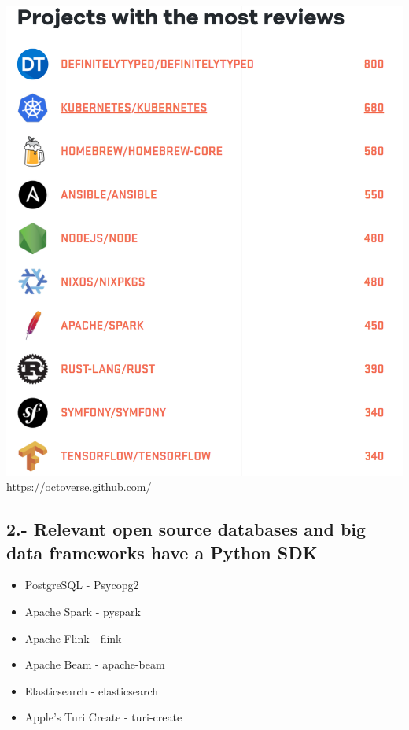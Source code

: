 \documentclass[11pt]{article}
\makeatletter
\def\maxwidth{\ifdim\Gin@nat@width>\linewidth\linewidth
    \else\Gin@nat@width\fi}
\let\Oldincludegraphics\includegraphics
\renewcommand{\includegraphics}[1]{\Oldincludegraphics[width=.8\maxwidth]{#1}}
\providecommand{\tightlist}{%
      \setlength{\itemsep}{0pt}\setlength{\parskip}{0pt}}
\makeatother
\begin{document}
\includegraphics{./img/top_2.png} https://octoverse.github.com/

    \hypertarget{relevant-open-source-databases-and-big-data-frameworks-have-a-python-sdk}{%
\subsection{2.- Relevant open source databases and big data frameworks
have a Python
SDK}\label{relevant-open-source-databases-and-big-data-frameworks-have-a-python-sdk}}

    \begin{itemize}
\tightlist
\item
  PostgreSQL - Psycopg2
\item
  Apache Spark - pyspark
\item
  Apache Flink - flink
\item
  Apache Beam - apache-beam
\item
  Elasticsearch - elasticsearch
\item
  Apple's Turi Create - turi-create
\end{itemize}
\end{document}
